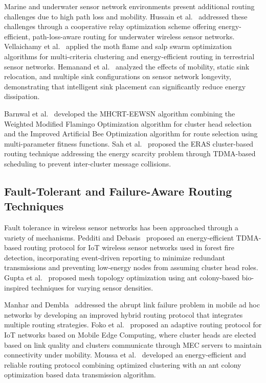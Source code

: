 \documentclass[a4paper,fleqn]{cas-dc}
\numberwithin{equation}{section}
\begin{document}
Marine and underwater sensor network environments present additional routing challenges due to high path loss and mobility. Hussain et al.~\cite{hussain2023cr} addressed these challenges through a cooperative relay optimization scheme offering energy-efficient, path-loss-aware routing for underwater wireless sensor networks. Vellaichamy et al.~\cite{vellaichamy2023wireless} applied the moth flame and salp swarm optimization algorithms for multi-criteria clustering and energy-efficient routing in terrestrial sensor networks. Hemanand et al.~\cite{hemanand2023analysis} analyzed the effects of mobility, static sink relocation, and multiple sink configurations on sensor network longevity, demonstrating that intelligent sink placement can significantly reduce energy dissipation.
 
Barnwal et al.~\cite{barnwal2023improved} developed the MHCRT-EEWSN algorithm combining the Weighted Modified Flamingo Optimization algorithm for cluster head selection and the Improved Artificial Bee Optimization algorithm for route selection using multi-parameter fitness functions. Sah et al.~\cite{sah2023efficient} proposed the ERAS cluster-based routing technique addressing the energy scarcity problem through TDMA-based scheduling to prevent inter-cluster message collisions.

\subsection{Fault-Tolerant and Failure-Aware Routing Techniques}
Fault tolerance in wireless sensor networks has been approached through a variety of mechanisms. Pedditi and Debasis~\cite{pedditi2023energy} proposed an energy-efficient TDMA-based routing protocol for IoT wireless sensor networks used in forest fire detection, incorporating event-driven reporting to minimize redundant transmissions and preventing low-energy nodes from assuming cluster head roles. Gupta et al.~\cite{gupta2024optimizing} proposed mesh topology optimization using ant colony-based bio-inspired techniques for varying sensor densities.
 
Manhar and Dembla~\cite{manhar2023improved} addressed the abrupt link failure problem in mobile ad hoc networks by developing an improved hybrid routing protocol that integrates multiple routing strategies. Foko et al.~\cite{foko2024arpmec} proposed an adaptive routing protocol for IoT networks based on Mobile Edge Computing, where cluster heads are elected based on link quality and clusters communicate through MEC servers to maintain connectivity under mobility. Moussa et al.~\cite{moussa2023novel} developed an energy-efficient and reliable routing protocol combining optimized clustering with an ant colony optimization based data transmission algorithm.
 
\end{document}
